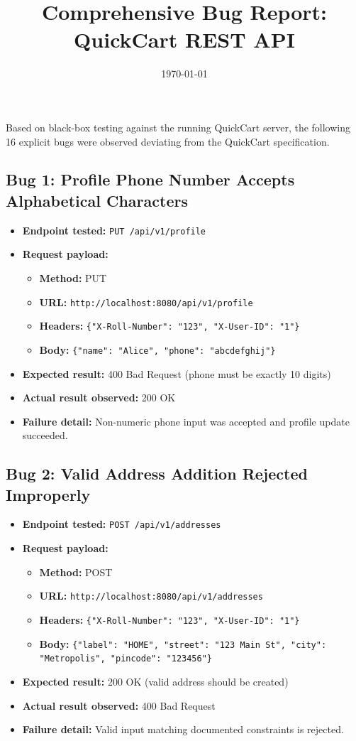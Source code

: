 ﻿\documentclass[11pt,a4paper]{article}
\title{Comprehensive Bug Report: QuickCart REST API}
\author{}
\date{\today}
\begin{document}
\maketitle

Based on black-box testing against the running QuickCart server, the following 16 explicit bugs were observed deviating from the QuickCart specification.

\subsection*{Bug 1: Profile Phone Number Accepts Alphabetical Characters}
\begin{itemize}
  \item \textbf{Endpoint tested:} \texttt{PUT /api/v1/profile}
  \item \textbf{Request payload:}
  \begin{itemize}
    \item \textbf{Method:} PUT
    \item \textbf{URL:} \texttt{http://localhost:8080/api/v1/profile}
    \item \textbf{Headers:} \texttt{\{"X-Roll-Number": "123", "X-User-ID": "1"\}}
    \item \textbf{Body:} \texttt{\{"name": "Alice", "phone": "abcdefghij"\}}
  \end{itemize}
  \item \textbf{Expected result:} 400 Bad Request (phone must be exactly 10 digits)
  \item \textbf{Actual result observed:} 200 OK
  \item \textbf{Failure detail:} Non-numeric phone input was accepted and profile update succeeded.
\end{itemize}

\subsection*{Bug 2: Valid Address Addition Rejected Improperly}
\begin{itemize}
  \item \textbf{Endpoint tested:} \texttt{POST /api/v1/addresses}
  \item \textbf{Request payload:}
  \begin{itemize}
    \item \textbf{Method:} POST
    \item \textbf{URL:} \texttt{http://localhost:8080/api/v1/addresses}
    \item \textbf{Headers:} \texttt{\{"X-Roll-Number": "123", "X-User-ID": "1"\}}
    \item \textbf{Body:} \texttt{\{"label": "HOME", "street": "123 Main St", "city": "Metropolis", "pincode": "123456"\}}
  \end{itemize}
  \item \textbf{Expected result:} 200 OK (valid address should be created)
  \item \textbf{Actual result observed:} 400 Bad Request
  \item \textbf{Failure detail:} Valid input matching documented constraints is rejected.
\end{itemize}
\end{document}
